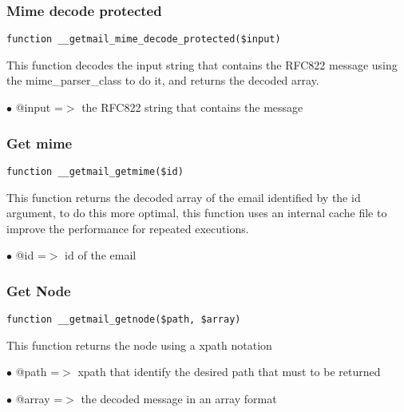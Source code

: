 \documentclass[a4paper]{article}
\begin{document}
\hypertarget{toc78}{}
\subsubsection{Mime decode protected}

\begin{lstlisting}
function __getmail_mime_decode_protected($input)
\end{lstlisting}

This function decodes the input string that contains the RFC822 message
using the mime\_parser\_class to do it, and returns the decoded array.

\begin{compactitem}
\item[\color{myblue}$\bullet$] @input =$>$ the RFC822 string that contains the message
\end{compactitem}

\hypertarget{toc79}{}
\subsubsection{Get mime}

\begin{lstlisting}
function __getmail_getmime($id)
\end{lstlisting}

This function returns the decoded array of the email identified by the id
argument, to do this more optimal, this function uses an internal cache
file to improve the performance for repeated executions.

\begin{compactitem}
\item[\color{myblue}$\bullet$] @id =$>$ id of the email
\end{compactitem}

\hypertarget{toc80}{}
\subsubsection{Get Node}

\begin{lstlisting}
function __getmail_getnode($path, $array)
\end{lstlisting}

This function returns the node using a xpath notation

\begin{compactitem}
\item[\color{myblue}$\bullet$] @path  =$>$ xpath that identify the desired path that must to be returned
\item[\color{myblue}$\bullet$] @array =$>$ the decoded message in an array format
\end{compactitem}
\end{document}
